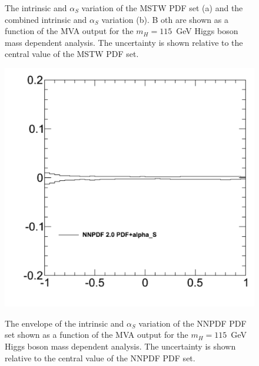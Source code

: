 \begin{figure}[!hbtp]\begin{center}\label{fig:appendix_signalshape_mstw}
\caption{The intrinsic and $\alpha_S$ variation of the MSTW PDF set (a) and the combined intrinsic and $\alpha_S$ variation (b). B
oth are shown as a function of the MVA output for the $m_H=115$~GeV Higgs boson mass dependent analysis. The uncertainty is shown 
relative to the central value of the MSTW PDF set.}
\end{center}
\end{figure}

\begin{figure}[!hbtp]
\begin{center}
\label{fig:appendix_signalshape_nnpdf}
\includegraphics[width=.45\textwidth]{figures/nn_hww115_ww_NNPDF_envelope.pdf}
\caption{The envelope of the intrinsic and $\alpha_S$ variation of the NNPDF PDF set shown as a function of the MVA output for the
 $m_H=115$~GeV Higgs boson mass dependent analysis. The uncertainty is shown relative to the central value of the NNPDF PDF set.}
\end{center}
\end{figure}

